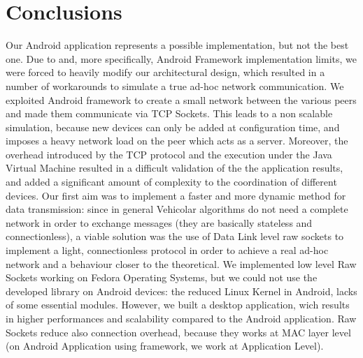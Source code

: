 \section{Conclusions}
	Our Android application represents a possible implementation, but not the best one. Due to \direct and, more specifically, Android \direct Framework implementation limits, we were forced to heavily modify our architectural design, which resulted in a number of workarounds to simulate a true ad-hoc network communication. We exploited Android \direct framework to create a small network between the various peers and made them communicate via TCP Sockets. This leads to a non scalable simulation, because new devices can only be added at configuration time, and imposes a heavy network load on the peer which acts as a server.
	Moreover, the overhead introduced by the TCP protocol and the execution under the Java Virtual Machine resulted in a difficult validation of the the application results, and added a significant amount of complexity to the coordination of different devices.
	Our first aim was to implement a faster and more dynamic method for data transmission: since in general Vehicolar algorithms do not need a complete network in order to exchange messages (they are basically stateless and connectionless), a viable solution was the use of Data Link level raw sockets to implement a light, connectionless protocol in order to achieve a real ad-hoc network and a behaviour closer to the theoretical. We implemented low level Raw Sockets working on Fedora Operating Systems, but we could not use the developed library on Android devices: the reduced Linux Kernel in Android, lacks of some essential modules. However, we built a desktop application, wich results in higher performances and scalability compared to the Android application. Raw Sockets reduce also connection overhead, because they works at MAC layer level (on Android Application using \direct framework, we work at Application Level).

